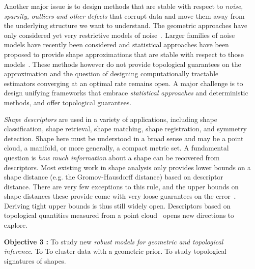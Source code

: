 Another major issue is to design methods that are stable with respect to {\em noise, sparsity, outliers and other defects} that corrupt data and move them away from the underlying structure we want to understand. The geometric approaches have only considered yet very restrictive models of noise~\cite{nsw-fhm-2008}.  Larger families of noise models have recently been considered and statistical approaches have been proposed to provide shape approximations that are stable with respect to those models~\cite{gpvw-mme-2011}. These methods however do not provide topological guarantees on the approximation and the question of designing computationally tractable estimators converging at an optimal rate remains open. A major challenge is to design unifying frameworks that embrace {\em statistical approaches} and deterministic methods, and offer topological guarantees.  

{\em Shape descriptors} are used in a variety of applications, including shape classification, shape retrieval, shape matching, shape registration, and symmetry detection.  Shape here must be understood in a broad sense and may be a point cloud, a manifold, or more generally, a compact metric set. A fundamental question is {\em how much information} about a shape can be recovered from descriptors. Most existing work in shape analysis only provides lower bounds on a shape distance (e.g. the Gromov-Hausdorff distance) based on descriptor distance. There are very few exceptions to this rule, and the upper bounds on shape distances these provide come with very loose guarantees on the error~\cite{bbk-gmds-06,ms-gh-05}. Deriving tight upper bounds is thus still widely open.  Descriptors based on topological quantities measured from a point cloud~\cite{ccgmo-ghsssp-09, socg-pbsds-10} opens new directions to explore. 



\vspace{2mm}

{\bf Objective 3 :} To study new {\em robust models for geometric and topological inference}.  To To cluster data with a geometric prior. To study topological signatures of shapes.

